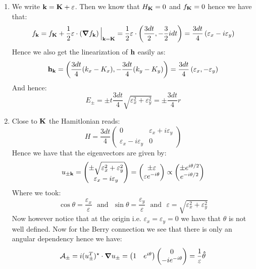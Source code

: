 \documentclass[10pt,a4paper]{article}
\begin{document}
\begin{enumerate}
\item We write $\vb{k} = \vb{K} + \vb{\varepsilon}$. Then we know that $H_{\vb{K}} = 0$ and $f_{\vb{K}} = 0$ hence we have that:
\[
f_{\vb{k}} = f_{\vb{K}}  + \frac{1}{2}\vb{\varepsilon} \cdot \left(\grad f_{\vb{k}} \right) \Big|_{\vb{k} = \vb{K}} = \frac{1}{2} \vb{\varepsilon} \cdot \left( \frac{3 d t}{2}, - \frac{3}{2} i d t  \right) = \frac{3dt}{4}\left( \varepsilon_x - i \varepsilon_y \right)
\] 
Hence we also get the linearization of $\vb{h}$ easily as:
\[
\vb{h}_{\vb{k}} = \left(\frac{3dt}{4} (k_x - K_x), -\frac{3 dt}{4} (k_y - K_y)\right)  = \frac{3 dt}{4}\left(\varepsilon_x, - \varepsilon_y \right)
\]
And hence:
\[
E_\pm = \pm t \frac{3 dt}{4} \sqrt{\varepsilon_x^2 + \varepsilon_y^2} = \pm \frac{3 d t}{4} r 
\]

\item Close to $\vb{K}$ the Hamitlonian reads:
\[
H = \frac{3 d t}{4}\begin{pmatrix}
0 & \varepsilon_x + i \varepsilon_y\\
\varepsilon_x - i \varepsilon_y & 0 
\end{pmatrix}
\]
Hence we have that the eigenvectors are given by:
\[
u_{\pm \vb{k}} = \begin{pmatrix}
\pm \sqrt{\varepsilon_x^2 + \varepsilon_y^2}\\
\varepsilon_x - i \varepsilon_y
\end{pmatrix} = \begin{pmatrix}
\pm \varepsilon\\
\varepsilon e^{-i \theta}
\end{pmatrix} \propto \begin{pmatrix}
\pm e^{i \theta/2}\\
e^{-i\theta/2}
\end{pmatrix}
\]
Where we took:
\[
\cos \theta = \frac{\varepsilon_x}{\varepsilon} \mbox{~~and~~} \sin \theta = \frac{\varepsilon_y}{\varepsilon} \mbox{~~and~~} \varepsilon = \sqrt{\varepsilon_x^2 + \varepsilon_y^2}
\]
Now however notice that at the origin i.e. $\varepsilon_x = \varepsilon_y = 0$ we have that $\theta$ is not well defined. Now for the Berry connection we see that there is only an angular dependency hence we have:
\[
\mathcal{A}_{\pm} = i (u_{\pm}^T)^\star \cdot \grad u_{\pm} = \begin{pmatrix}
1 & e^{i\theta}
\end{pmatrix} \begin{pmatrix}
0\\
-i e^{-i \theta}
\end{pmatrix} =  \frac{1}{\varepsilon} \vu{\theta} 
\]


\end{enumerate}
\end{document}
